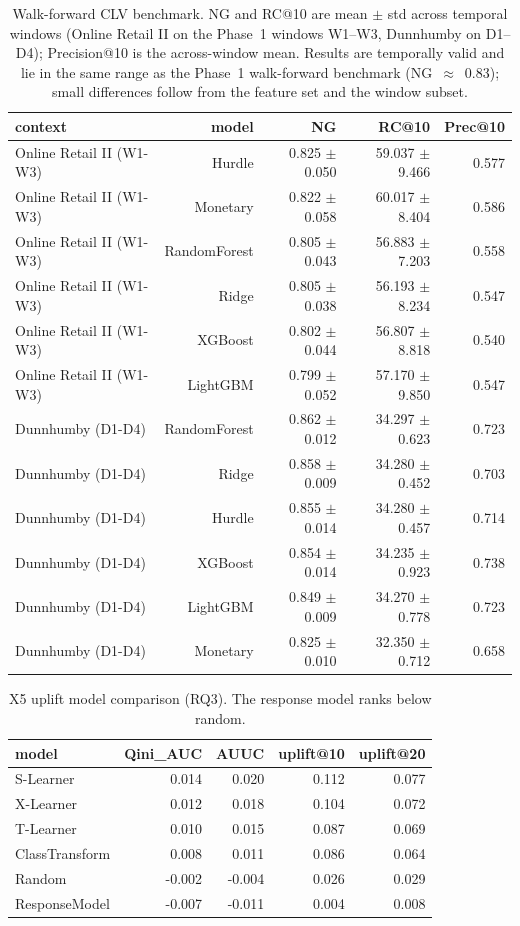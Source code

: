 \begin{table}[t]\centering
\caption{Walk-forward CLV benchmark. NG and RC@10 are mean $\pm$ std across temporal windows (Online Retail II on the Phase~1 windows W1--W3, Dunnhumby on D1--D4); Precision@10 is the across-window mean. Results are temporally valid and lie in the same range as the Phase~1 walk-forward benchmark (NG~$\approx$~0.83); small differences follow from the feature set and the window subset.}\label{tab:clvwf}
\begin{tabular}{lrrrr}
\hline
context & model & NG & RC@10 & Prec@10 \\
\hline
Online Retail II (W1-W3) & Hurdle & 0.825 $\pm$ 0.050 & 59.037 $\pm$ 9.466 & 0.577 \\
Online Retail II (W1-W3) & Monetary & 0.822 $\pm$ 0.058 & 60.017 $\pm$ 8.404 & 0.586 \\
Online Retail II (W1-W3) & RandomForest & 0.805 $\pm$ 0.043 & 56.883 $\pm$ 7.203 & 0.558 \\
Online Retail II (W1-W3) & Ridge & 0.805 $\pm$ 0.038 & 56.193 $\pm$ 8.234 & 0.547 \\
Online Retail II (W1-W3) & XGBoost & 0.802 $\pm$ 0.044 & 56.807 $\pm$ 8.818 & 0.540 \\
Online Retail II (W1-W3) & LightGBM & 0.799 $\pm$ 0.052 & 57.170 $\pm$ 9.850 & 0.547 \\
Dunnhumby (D1-D4) & RandomForest & 0.862 $\pm$ 0.012 & 34.297 $\pm$ 0.623 & 0.723 \\
Dunnhumby (D1-D4) & Ridge & 0.858 $\pm$ 0.009 & 34.280 $\pm$ 0.452 & 0.703 \\
Dunnhumby (D1-D4) & Hurdle & 0.855 $\pm$ 0.014 & 34.280 $\pm$ 0.457 & 0.714 \\
Dunnhumby (D1-D4) & XGBoost & 0.854 $\pm$ 0.014 & 34.235 $\pm$ 0.923 & 0.738 \\
Dunnhumby (D1-D4) & LightGBM & 0.849 $\pm$ 0.009 & 34.270 $\pm$ 0.778 & 0.723 \\
Dunnhumby (D1-D4) & Monetary & 0.825 $\pm$ 0.010 & 32.350 $\pm$ 0.712 & 0.658 \\
\hline
\end{tabular}
\end{table}

\begin{table}[t]\centering
\caption{X5 uplift model comparison (RQ3). The response model ranks below random.}\label{tab:uplift}
\begin{tabular}{lrrrr}
\hline
model & Qini\_AUC & AUUC & uplift@10 & uplift@20 \\
\hline
S-Learner & 0.014 & 0.020 & 0.112 & 0.077 \\
X-Learner & 0.012 & 0.018 & 0.104 & 0.072 \\
T-Learner & 0.010 & 0.015 & 0.087 & 0.069 \\
ClassTransform & 0.008 & 0.011 & 0.086 & 0.064 \\
Random & -0.002 & -0.004 & 0.026 & 0.029 \\
ResponseModel & -0.007 & -0.011 & 0.004 & 0.008 \\
\hline
\end{tabular}
\end{table}

